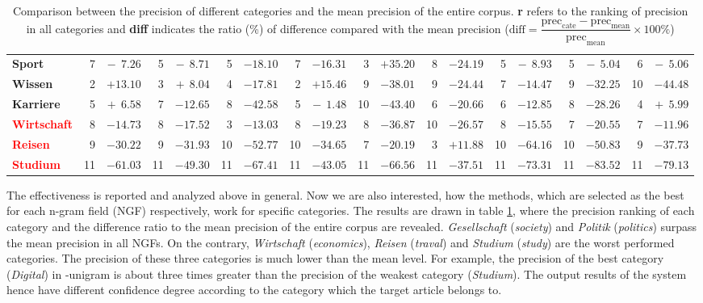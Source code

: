 \begin{table}[!htb]
{\begin{tabular}{lrr|rr|rr|rr|rr|rr|rr|rr|rr}
\textbf{Sport} & 7 & $-~~7.26$ & 5 & $-~~8.71$ & 5 & $-18.10$ & 7 & $-16.31$ & 3 & $+35.20$ & 8 & $-24.19$ & 5 & $-~~8.93$ & 5 & $-~~5.04$ & 6 & $-~~5.06$ \\
\textbf{Wissen} & 2 & $+13.10$ & 3 & $+~~8.04$ & 4 & $-17.81$ & 2 & $+15.46$ & 9 & $-38.01$ & 9 & $-24.44$ & 7 & $-14.47$ & 9 & $-32.25$ & 10 & $-44.48$ \\
\textbf{Karriere} & 5 & $+~~6.58$ & 7 & $-12.65$ & 8 & $-42.58$ & 5 & $-~~1.48$ & 10 & $-43.40$ & 6 & $-20.66$ & 6 & $-12.85$ & 8 & $-28.26$ & 4 & $+~~5.99$ \\
\textbf{\textcolor{red}{Wirtschaft}} & 8 & $-14.73$ & 8 & $-17.52$ & 3 & $-13.03$ & 8 & $-19.23$ & 8 & $-36.87$ & 10 & $-26.57$ & 8 & $-15.55$ & 7 & $-20.55$ & 7 & $-11.96$ \\
\textbf{\textcolor{red}{Reisen}} & 9 & $-30.22$ & 9 & $-31.93$ & 10 & $-52.77$ & 10 & $-34.65$ & 7 & $-20.19$ & 3 & $+11.88$ & 10 & $-64.16$ & 10 & $-50.83$ & 9 & $-37.73$ \\
\textbf{\textcolor{red}{Studium}} & 11 & $-61.03$ & 11 & $-49.30$ & 11 & $-67.41$ & 11 & $-43.05$ & 11 & $-66.56$ & 11 & $-37.51$ & 11 & $-73.31$ & 11 & $-83.52$ & 11 & $-79.13$ \\ \hline
\end{tabular}%
}
\caption{Comparison between the precision of different categories and the mean precision of the entire corpus. \textbf{r} refers to the ranking of precision in all categories and \textbf{diff} indicates the ratio (\%) of difference compared with the mean precision ($\text{diff} = \dfrac{\text{prec}_{\text{cate}} - \text{prec}_{\text{mean}}}{\text{prec}_{\text{mean}}}\times 100\%$)}
\label{tab:cate_precision}
\end{table}


The effectiveness is reported and analyzed above in general. Now we are also interested, how the methods, which are selected as the best for each n-gram field (NGF) respectively, work for specific categories. The results are drawn in table \ref{tab:cate_precision}, where the precision ranking of each category and the difference ratio to the mean precision of the entire corpus are revealed. \textit{Gesellschaft} (\textit{society}) and \textit{Politik} (\textit{politics}) surpass the mean precision in all NGFs. On the contrary, \textit{Wirtschaft} (\textit{economics}), \textit{Reisen} (\textit{traval}) and \textit{Studium} (\textit{study}) are the worst performed categories. The precision of these three categories is much lower than the mean level. For example, the precision of the best category (\textit{Digital}) in \icontent{}-unigram is about three times greater than the precision of the weakest category (\textit{Studium}). The output results of the system hence have different confidence degree according to the category which the target article belongs to. 

